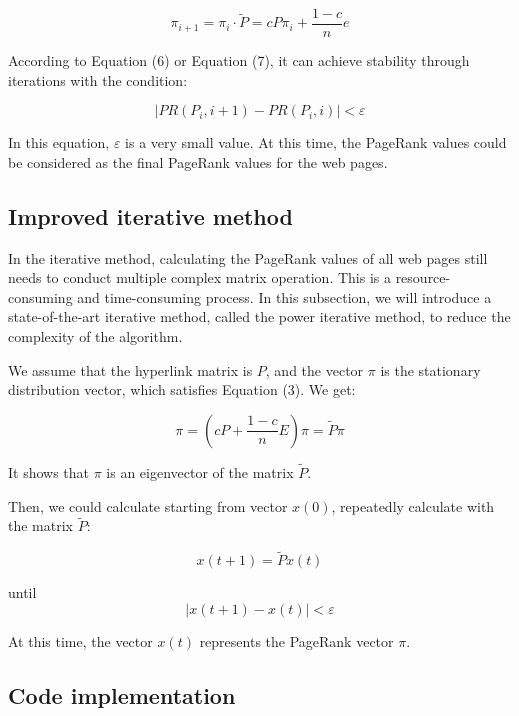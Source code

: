 \documentclass[lettersize,journal,12pt,conference]{IEEEtran}
\begin{document}
\begin{equation}
	\label{eq:7}
	\pi_{i+1} = \pi_i \cdot \widetilde{P} = cP\pi_i + \frac{1 - c}{n} e
\end{equation}

According to Equation (6) or Equation (7), it can achieve stability through iterations with the condition:

\begin{equation}
	\label{eq:8}
	|PR(P_i, i+1) - PR(P_i, i)| < \varepsilon
\end{equation}
 
In this equation, \(\varepsilon\) is a very small value. At this time, the PageRank values could be considered as the final PageRank values for the web pages.

\subsection{Improved iterative method}

In the iterative method, calculating the PageRank values of all web pages still needs to conduct multiple complex matrix operation. This is a resource-consuming and time-consuming process. In this subsection, we will introduce a state-of-the-art iterative method, called the power iterative method, to reduce the complexity of the algorithm.

We assume that the hyperlink matrix is $P$, and the vector $\pi$ is the stationary distribution vector, which satisfies Equation (3). We get: 

\begin{equation}
	\label{eq:9}
	\pi = (cP + \frac{1 - c}{n}E)\pi = \widetilde{P}\pi
\end{equation}

It shows that $\pi$ is an eigenvector of the matrix $\widetilde{P}$.

Then, we could calculate starting from vector $x(0)$, repeatedly calculate with the matrix $\widetilde{P}$: 

\begin{equation}
	\label{eq:10}
	x(t+1) = \widetilde{P}x(t)
\end{equation}

until 
\begin{equation}
	\label{eq:11}
	|x(t+1) - x(t)| < \varepsilon
\end{equation}

At this time, the vector $x(t)$ represents the PageRank vector $\pi$.

\subsection{Code implementation}
\end{document}
